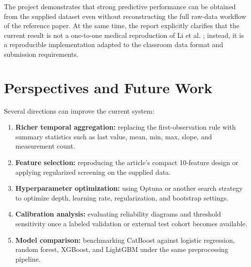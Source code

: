 \documentclass[a4paper,12pt]{extreport}
\begin{document}
The project demonstrates that strong predictive performance can be obtained from the supplied dataset even without reconstructing the full raw-data workflow of the reference paper. At the same time, the report explicitly clarifies that the current result is not a one-to-one medical reproduction of Li et al. \cite{li2022prediction}; instead, it is a reproducible implementation adapted to the classroom data format and submission requirements.

\section{Perspectives and Future Work}
Several directions can improve the current system:
\begin{enumerate}[leftmargin=1.7em]
    \item \textbf{Richer temporal aggregation:} replacing the first-observation rule with summary statistics such as last value, mean, min, max, slope, and measurement count.
    \item \textbf{Feature selection:} reproducing the article's compact 10-feature design or applying regularized screening on the supplied data.
    \item \textbf{Hyperparameter optimization:} using Optuna or another search strategy to optimize depth, learning rate, regularization, and bootstrap settings.
    \item \textbf{Calibration analysis:} evaluating reliability diagrams and threshold sensitivity once a labeled validation or external test cohort becomes available.
    \item \textbf{Model comparison:} benchmarking CatBoost against logistic regression, random forest, XGBoost, and LightGBM under the same preprocessing pipeline.
\end{enumerate}

\printbibliography[heading=bibintoc,title={References}]
\end{document}
